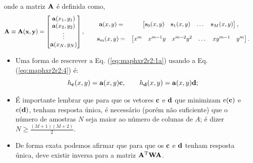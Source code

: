 \begin{theorem}
\begin{equation}
\end{equation}
onde a matriz $\MATRIX{A}$ é definida como,
\begin{equation}\label{eq:maphxr2r2:4}
\MATRIX{A}\equiv\MATRIX{A}(\VECTOR{x},\VECTOR{y})=\begin{bmatrix}
\VECTOR{a}(x_1,y_1)\\
\VECTOR{a}(x_2,y_2)\\
\vdots\\
\VECTOR{a}(x_N,y_N)\\
\end{bmatrix}, \qquad
\begin{matrix}
\VECTOR{a}(x,y)= &
\begin{bmatrix}
\VECTOR{s}_{0}(x,y) & \VECTOR{s}_{1}(x,y) &  \dots  & \VECTOR{s}_{M}(x,y)
\end{bmatrix},\\
~&~\\
\VECTOR{s}_{m}(x,y)=&
\begin{bmatrix}
x^m  & x^{m-1} y  & x^{m-2} y^2    & \dots  & x y^{m-1} &  y^m 
\end{bmatrix}.
\end{matrix}
\end{equation}


\end{theorem}

\begin{tcbattention}
\begin{itemize}
\item Uma forma de rescrever a Eq. (\ref{eq:maphxr2r2:1a}) usando a Eq. (\ref{eq:maphxr2r2:4}) é:
\begin{equation}\label{eq:maphxr2r2:5}
h_{\VECTOR{c}}(x,y) = \VECTOR{a}(x,y)\VECTOR{c}, 
\qquad
h_{\VECTOR{d}}(x,y) = \VECTOR{a}(x,y)\VECTOR{d}; 
\end{equation}

\item É importante lembrar que para que os vetores $\VECTOR{c}$ e $\VECTOR{d}$
que minimizam $e(\VECTOR{c})$ e $e(\VECTOR{d})$, tenham resposta única,
é necessário (porém não suficiente) que o número de amostras $N$ seja maior ao número de colunas de $A$;
é dizer $N\geq \frac{(M+1)(M+2)}{2}$.

\item De forma exata podemos afirmar que para que os $\VECTOR{c}$ e  $\VECTOR{d}$ tenham resposta única,
deve existir inversa para a matriz $\MATRIX{A}^{\transpose}\MATRIX{W}\MATRIX{A}$.

\end{itemize}
\end{tcbattention}


